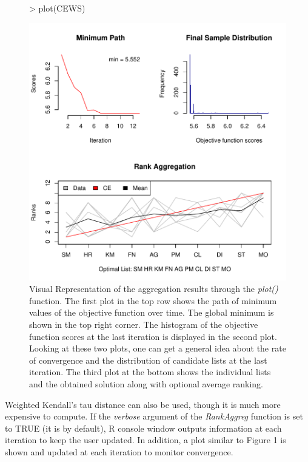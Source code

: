 \documentclass[11pt]{article}
\begin{document}
\begin{figure}[hp]
\begin{center}
\begin{Schunk}
\begin{Sinput}
> plot(CEWS)
\end{Sinput}
\end{Schunk}
\includegraphics{RankAggreg-fig1}
\caption{Visual Representation of the aggregation results through the \emph{plot()} function. The first plot
in the top row shows the path of minimum values of the objective function over time. The global minimum is shown
in the top right corner. The histogram of the objective function scores at the last iteration is displayed in the
second plot. Looking at these two plots, one can get a general idea about the rate of convergence and the distribution
of candidate lists at the last iteration. The third plot at the bottom shows the individual lists and the obtained solution
along with optional average ranking.}
\end{center}
\end{figure}

Weighted Kendall's tau distance can also be used, though it is much more expensive to compute. If the \emph{verbose} argument
of the \emph{RankAggreg} function is set to TRUE (it is by default), R console window outputs information at each iteration
to keep the user updated. In addition, a plot similar to Figure 1 is shown and updated at each iteration to monitor convergence.
\end{document}
